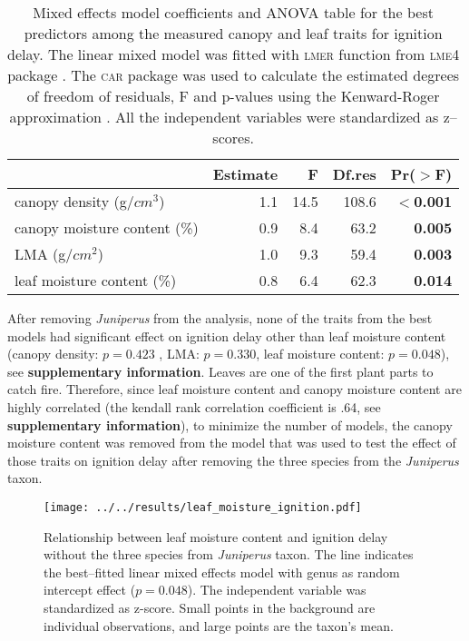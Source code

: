 \documentclass{bmcart}
\newcommand{\pkg}[1]{\textsc{#1}}
\begin{document}
\begin{table}
  \centering
  \caption{Mixed effects model coefficients and ANOVA table for the best
    predictors among the measured canopy and leaf traits for ignition delay.
    The linear mixed model was fitted with \pkg{lmer} function from \pkg{lme4}
    package \citep{bates2009package}. The \pkg{car} package
    \citep{fox2013hypothesis} was used to calculate the estimated degrees of
    freedom of residuals, F and p-values using the Kenward-Roger approximation
    \citep{kenward1997small}. All the independent variables were standardized
    as z--scores.}
  \begin{tabular}{lrrrr}
    \toprule
    & Estimate & F & Df.res & Pr($>$F) \\ 
    \midrule
    canopy density (g/{$cm^3$}) & 1.1 & 14.5  & 108.6 & \textbf{$<$0.001} \\ 
    canopy moisture content (\%) & 0.9 & 8.4 & 63.2 & \textbf{0.005} \\ 
    LMA (g/{$cm^2$}) & 1.0 & 9.3  & 59.4 & \textbf{0.003} \\  
    leaf moisture content (\%) & 0.8 & 6.4  & 62.3 & \textbf{0.014} \\ 
    \bottomrule
  \end{tabular}
  \label{tab:fandpforig_delay}
\end{table}
After removing \emph{Juniperus} from the analysis, none of the traits from the best models had significant effect on ignition delay other than leaf moisture content (canopy density: $p = 0.423$ , LMA: $p = 0.330$, leaf moisture content: $p = 0.048$), see \textbf{supplementary information}. Leaves are one of the first plant parts to catch fire. Therefore, since leaf moisture content and canopy moisture content are highly correlated (the kendall rank correlation coefficient is .64, see \textbf{supplementary information}), to minimize the number of models, the canopy moisture content was removed from the model that was used to test the effect of those traits on ignition delay after removing the three species from the \emph{Juniperus} taxon.

\begin{figure}
  \centering 
  \texttt{[image: ../../results/leaf\_moisture\_ignition.pdf]}
  \caption[Leaf moisture content effect on ignition delay]{\label{fig:leafmc_ig_delay}Relationship between leaf moisture content and ignition delay without the three species from \emph{Juniperus} taxon. The line indicates the best--fitted linear mixed effects model with genus as random intercept effect ($p = 0.048$). The independent variable was standardized  as z-score. Small points in the background are individual observations, and large points are the taxon's mean.} 
\end{figure}
\end{document}
